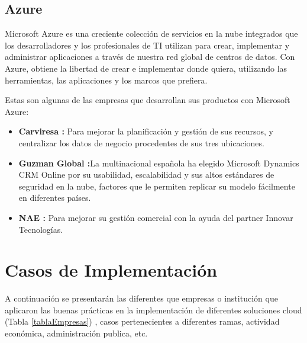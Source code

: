 \documentclass[a4paper, 12pt]{report}
\begin{document}
\subsection{Azure}
\begin{justify}
Microsoft Azure es una creciente colección de servicios en la nube integrados que los desarrolladores y los profesionales de TI utilizan para crear, implementar y administrar aplicaciones a través de nuestra red global de centros de datos. Con Azure, obtiene la libertad de crear e implementar donde quiera, utilizando las herramientas, las aplicaciones y los marcos que prefiera.\citep{azure_def}

Estas son algunas de las empresas que  desarrollan sus productos con Microsoft Azure:
\begin{itemize}
	\item \textbf{Carviresa :} Para mejorar la planificación y gestión de sus recursos, y centralizar los datos de negocio procedentes de sus tres ubicaciones.
	\item \textbf{Guzman Global :}La multinacional española ha elegido Microsoft Dynamics CRM Online por su usabilidad, escalabilidad y sus altos estándares de seguridad en la nube, factores que le permiten replicar su modelo fácilmente en diferentes países.
	\item \textbf{NAE :} Para mejorar su gestión comercial con la ayuda del partner Innovar Tecnologías.
\end{itemize}

\end{justify}

\section{Casos de Implementación}
	\begin{justify}
	A continuación se presentarán  las diferentes que empresas o instituci\'on que aplicaron las buenas pr\'acticas en la implementaci\'on de diferentes soluciones cloud (Tabla \ref{tablaEmpresas}) , casos pertenecientes a diferentes ramas, actividad económica, administración publica, etc.
	\end{justify}
\end{document}
